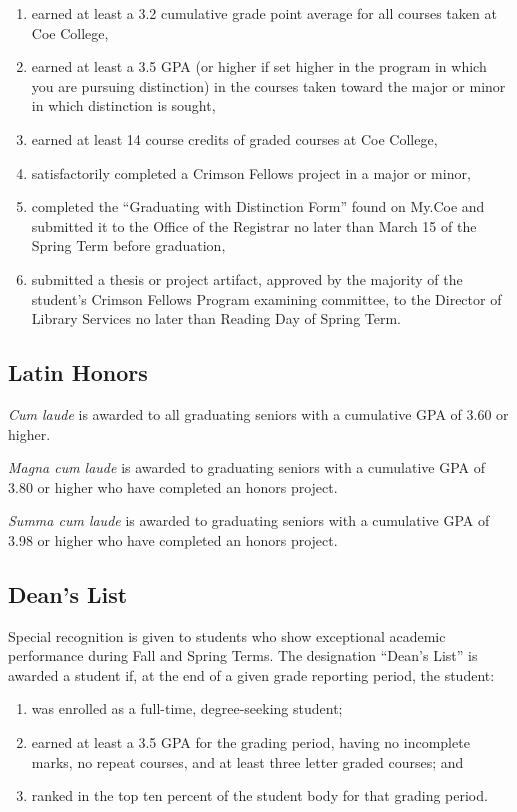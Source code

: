 \documentclass[
  letterpaper,
]{scrbook}
\providecommand{\tightlist}{%
  \setlength{\itemsep}{0pt}\setlength{\parskip}{0pt}}
\begin{document}
\begin{enumerate}
\def\labelenumi{\arabic{enumi}.}
\tightlist
\item
  earned at least a 3.2 cumulative grade point average for all courses
  taken at Coe College,
\item
  earned at least a 3.5 GPA (or higher if set higher in the program in
  which you are pursuing distinction) in the courses taken toward the
  major or minor in which distinction is sought,
\item
  earned at least 14 course credits of graded courses at Coe College,
\item
  satisfactorily completed a Crimson Fellows project in a major or
  minor,
\item
  completed the ``Graduating with Distinction Form'' found on My.Coe and
  submitted it to the Office of the Registrar no later than March 15 of
  the Spring Term before graduation,
\item
  submitted a thesis or project artifact, approved by the majority of
  the student's Crimson Fellows Program examining committee, to the
  Director of Library Services no later than Reading Day of Spring Term.
\end{enumerate}

\subsection{Latin Honors}\label{latin-honors}

\emph{Cum laude} is awarded to all graduating seniors with a cumulative
GPA of 3.60 or higher.

\emph{Magna cum laude} is awarded to graduating seniors with a
cumulative GPA of 3.80 or higher who have completed an honors project.

\emph{Summa cum laude} is awarded to graduating seniors with a
cumulative GPA of 3.98 or higher who have completed an honors project.

\subsection{Dean's List}\label{deans-list}

Special recognition is given to students who show exceptional academic
performance during Fall and Spring Terms. The designation ``Dean's
List'' is awarded a student if, at the end of a given grade reporting
period, the student:

\begin{enumerate}
\def\labelenumi{\arabic{enumi}.}
\tightlist
\item
  was enrolled as a full-time, degree-seeking student;
\item
  earned at least a 3.5 GPA for the grading period, having no incomplete
  marks, no repeat courses, and at least three letter graded courses;
  and
\item
  ranked in the top ten percent of the student body for that grading
  period.
\end{enumerate}
\end{document}
